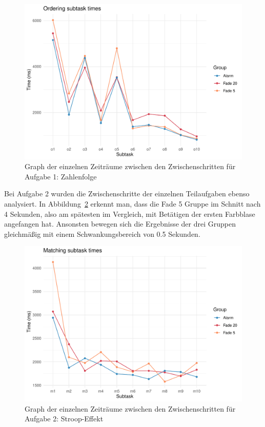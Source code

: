 \begin{figure}[H]
	\centering
	\includegraphics[width=\textwidth]{./_StudyResults/timeTask1}
	\caption{Graph der einzelnen Zeiträume zwischen den Zwischenschritten für Aufgabe 1: Zahlenfolge}
	\label{fig:timeTask1}
\end{figure}

Bei Aufgabe 2 wurden die Zwischenschritte der einzelnen Teilaufgaben ebenso analysiert. In Abbildung~\ref{fig:timeTask2} erkennt man, dass die Fade 5 Gruppe im Schnitt nach 4 Sekunden, also am spätesten im Vergleich, mit Betätigen der ersten Farbblase angefangen hat. Ansonsten bewegen sich die Ergebnisse der drei Gruppen gleichmäßig mit einem Schwankungsbereich von 0.5 Sekunden.

\begin{figure}[H]
	\centering
	\includegraphics[width=\textwidth]{./_StudyResults/timeTask2}
	\caption{Graph der einzelnen Zeiträume zwischen den Zwischenschritten für Aufgabe 2: Stroop-Effekt}
	\label{fig:timeTask2}
\end{figure}

